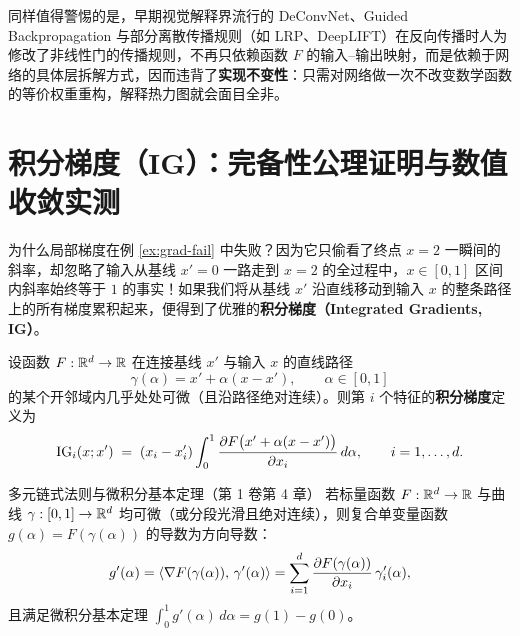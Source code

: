 同样值得警惕的是，早期视觉解释界流行的 DeConvNet、Guided Backpropagation 与部分离散传播规则（如 LRP、DeepLIFT）在反向传播时人为修改了非线性门的传播规则，不再只依赖函数 $F$ 的输入--输出映射，而是依赖于网络的具体层拆解方式，因而违背了\textbf{实现不变性}：只需对网络做一次不改变数学函数的等价权重重构，解释热力图就会面目全非。

\section{积分梯度（IG）：完备性公理证明与数值收敛实测}

为什么局部梯度在例 \ref{ex:grad-fail} 中失败？因为它只偷看了终点 $x = 2$ 一瞬间的斜率，却忽略了输入从基线 $x' = 0$ 一路走到 $x = 2$ 的全过程中，$x \in [0, 1]$ 区间内斜率始终等于 $1$ 的事实！如果我们将从基线 $x'$ 沿直线移动到输入 $x$ 的整条路径上的所有梯度累积起来，便得到了优雅的\textbf{积分梯度（Integrated Gradients, IG）}。

\begin{defBox}
\begin{definition}\label{def:ig}
设函数 $F: \mathbb{R}^d \to \mathbb{R}$ 在连接基线 $x'$ 与输入 $x$ 的直线路径
\[
  \gamma(\alpha) = x' + \alpha (x - x'), \qquad \alpha \in [0, 1]
\]
的某个开邻域内几乎处处可微（且沿路径绝对连续）。则第 $i$ 个特征的\textbf{积分梯度}定义为
\begin{equation}\label{eq:ig-def}
  \operatorname{IG}_i(x; x') \;=\; (x_i - x'_i) \int_0^1 \frac{\partial F\big(x' + \alpha(x - x')\big)}{\partial x_i}\,d\alpha,
  \qquad i = 1, \dots, d.
\end{equation}
\end{definition}
\end{defBox}

\begin{recallBox}{多元链式法则与微积分基本定理（第 1 卷第 4 章）}
若标量函数 $F: \mathbb{R}^d \to \mathbb{R}$ 与曲线 $\gamma: [0,1] \to \mathbb{R}^d$ 均可微（或分段光滑且绝对连续），则复合单变量函数 $g(\alpha) = F(\gamma(\alpha))$ 的导数为方向导数：
\[
  g'(\alpha) = \left\langle \nabla F(\gamma(\alpha)),\, \gamma'(\alpha) \right\rangle = \sum_{i=1}^d \frac{\partial F(\gamma(\alpha))}{\partial x_i}\,\gamma'_i(\alpha),
\]
且满足微积分基本定理 $\int_0^1 g'(\alpha)\,d\alpha = g(1) - g(0)$。
\end{recallBox}

